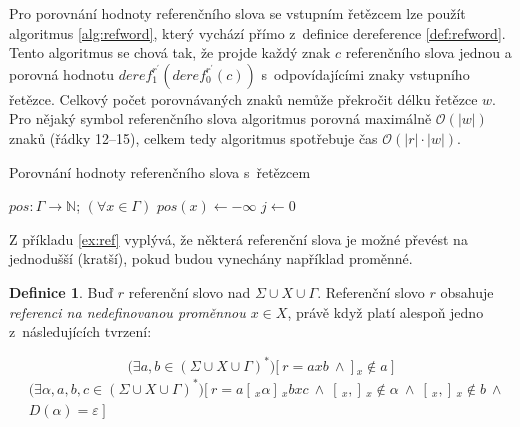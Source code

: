 \documentclass[thesis=B,czech]{FITthesis}[2019/12/23]
\theoremstyle{definition}
\newtheorem{definition}{Definice}[chapter]
\begin{document}
Pro porovnání hodnoty referenčního slova se vstupním řetězcem lze použít algoritmus \ref{alg:refword}, který vychází přímo z~definice dereference \ref{def:refword}. Tento algoritmus se chová tak, že projde každý znak $c$ referenčního slova jednou a porovná hodnotu $deref_1^{r^\prime}  \left( deref_0^{r^\prime}  \left( c \right) \right)$ s~odpovídajícími znaky vstupního řetězce. Celkový počet porovnávaných znaků nemůže překročit délku řetězce $w$. Pro nějaký symbol referenčního slova algoritmus porovná maximálně $\mathcal{O}(|w|)$ znaků (řádky 12--15), celkem tedy algoritmus spotřebuje čas  $\mathcal{O}(|r|\cdot|w|)$. 

\begin{algorithm}
		
  \caption{Porovnání hodnoty referenčního slova s~řetězcem}\label{alg:refword}
	\DontPrintSemicolon
    $pos : \Gamma \rightarrow \mathbb{N}$; $(\forall x \in \Gamma)$ $pos(x) \gets -\infty$\;
    $j \gets 0$

  
\end{algorithm}


Z příkladu \ref{ex:ref} vyplývá, že některá referenční slova je možné převést na jednodušší (kratší), pokud budou vynechány například  proměnné. 

\begin{definition}
Buď $r$ referenční slovo nad ${\Sigma \cup X \cup \Gamma}$. Referenční slovo $r$ obsahuje \emph{referenci na nedefinovanou proměnnou $x \in X$}, právě když platí alespoň jedno z~následujících tvrzení:

	\begin{equation}\label{eq:ref1}\bigg (\exists  a, b \in \left(\Sigma \cup X \cup \Gamma\right)^\ast\bigg) \bigg [ \ r = a x b \ \wedge \ ]\,_x \notin a \ \bigg ]\end{equation}
	\begin{equation}\begin{split}\label{eq:ref2}&\bigg(\exists  \alpha, a, b, c \in \left(\Sigma \cup X \cup \Gamma\right)^\ast\bigg) \bigg [ \ r = a [\,_x \alpha  ]\,_x b x c \ \wedge \ [\,_x, ]\,_x \notin \alpha  \ \wedge \ [\,_x ,  ]\,_x \notin b \ \wedge \\&D \left( \alpha \right) = \varepsilon \ \bigg ] \end{split}\end{equation}
\end{definition}
\end{document}
